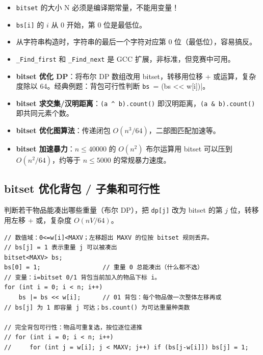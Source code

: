 \documentclass[UTF8,openany,oneside,zihao=-4]{ctexbook}
\begin{document}
\begin{warn}
\begin{itemize}
  \item \lstinline|bitset| 的大小 N 必须是编译期常量，不能用变量！
  \item \lstinline|bs[i]| 的 $i$ 从 0 开始，第 0 位是最低位。
  \item 从字符串构造时，字符串的最后一个字符对应第 0 位（最低位），容易搞反。
  \item \lstinline|_Find_first| 和 \lstinline|_Find_next| 是 GCC 扩展，非标准，但竞赛中可用。
\end{itemize}
\end{warn}

\begin{tip}
\begin{itemize}
  \item \textbf{bitset 优化 DP}：将布尔 DP 数组改用 bitset，转移用位移 + 或运算，复杂度除以 64。经典例题：背包可行性判断 \lstinline|bs |= (bs << w[i])|。
  \item \textbf{bitset 求交集/汉明距离}：\lstinline|(a ^ b).count()| 即汉明距离，\lstinline|(a & b).count()| 即共同元素个数。
  \item \textbf{bitset 优化图算法}：传递闭包 $O(n^3/64)$，二部图匹配加速等。
  \item \textbf{bitset 加速暴力}：$n \le 40000$ 的 $O(n^2)$ 布尔运算用 bitset 可以压到 $O(n^2/64)$，约等于 $n \le 5000$ 的常规暴力速度。
\end{itemize}
\end{tip}

\subsection{bitset 优化背包 / 子集和可行性}

\begin{note}
判断若干物品能凑出哪些重量（布尔 DP），把 \lstinline|dp[j]| 改为 bitset 的第 $j$ 位，转移用左移 + 或，复杂度 $O(nV/64)$。
\end{note}

\begin{lstlisting}
// 数值域：0<=w[i]<MAXV；左移超出 MAXV 的位按 bitset 规则丢弃。
// bs[j] = 1 表示重量 j 可以被凑出
bitset<MAXV> bs;
bs[0] = 1;                 // 重量 0 总能凑出（什么都不选）
// 变量：i=bitset 0/1 背包当前加入的物品下标 i。
for (int i = 0; i < n; i++)
    bs |= bs << w[i];      // 01 背包：每个物品做一次整体左移再或
// bs[j] 为 1 即容量 j 可达；bs.count() 为可达重量种类数

// 完全背包可行性：物品可重复选，按位逐位递推
// for (int i = 0; i < n; i++)
//     for (int j = w[i]; j < MAXV; j++) if (bs[j-w[i]]) bs[j] = 1;
\end{lstlisting}
\end{document}
